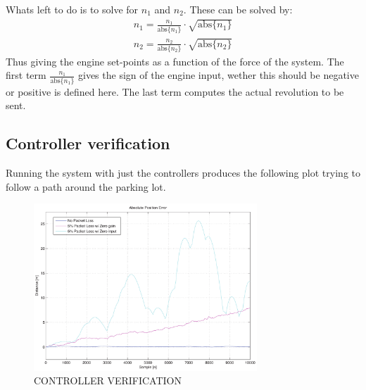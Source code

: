 \documentclass{ifacconf}
\begin{document}
Whats left to do is to solve for $n_1$ and $n_2$. These can be solved by:
\begin{align}
n_1 = \frac{n_1}{\text{abs}\{n_1\}} \cdot \sqrt{\text{abs}\{n_1\}}\\
n_2 = \frac{n_2}{\text{abs}\{n_2\}} \cdot \sqrt{\text{abs}\{n_2\}}
\end{align}
Thus giving the engine set-points as a function of the force of the system. The first term $\frac{n_1}{\text{abs}\{n_1\}}$ gives the sign of the engine input, wether this should be negative or positive is defined here. The last term computes the actual revolution to be sent. 


\subsection{Controller verification}
Running the system with just the controllers produces the following plot trying to follow a path around the parking lot. 
\begin{figure}
	\begin{center}
		\includegraphics[width=8.4cm]{img/abspos}    %
		\caption{CONTROLLER VERIFICATION}  %
		\label{fig:3points}               
	\end{center}                                 %
\end{figure}
\end{document}
